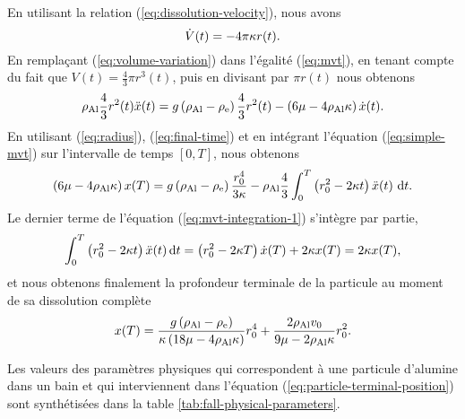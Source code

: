 En utilisant la relation (\ref{eq:dissolution-velocity}), nous avons
\begin{equation}\label{eq:volume-variation}
  \dot V(t) = -4\pi \kappa r(t).
\end{equation}
En remplaçant (\ref{eq:volume-variation}) dans l'égalité
(\ref{eq:mvt}), en tenant compte du fait que $V(t) = \frac{4}{3}\pi
r^3(t)$, puis en divisant par $\pi r(t)$ nous obtenons
\begin{equation}\label{eq:simple-mvt}
\rho_\mathrm{Al} \frac{4}{3}r^2(t)\ddot x(t)
= g\left( \rho_\mathrm{Al} - \rho_\mathrm{e} \right)\frac{4}{3}r^2(t) -
\left( 6\mu - 4\rho_\mathrm{Al}
  \kappa \right)\dot x(t).
\end{equation}
En utilisant (\ref{eq:radius}), (\ref{eq:final-time}) et en
intégrant l'équation (\ref{eq:simple-mvt}) sur l'intervalle de temps $[0, T]$, nous
obtenons
\begin{equation}\label{eq:mvt-integration-1}
\left( 6\mu - 4\rho_\mathrm{Al}\kappa \right)x(T)
= g\left( \rho_\mathrm{Al} -
  \rho_\mathrm{e} \right)\frac{r_0^4}{3\kappa}-\rho_\mathrm{Al}\frac{4}{3}\int_0^T\left( r_0^2
- 2\kappa t \right)\ddot x(t)\,\,\mathrm dt.
\end{equation}
Le dernier terme de l'équation (\ref{eq:mvt-integration-1}) s'intègre
par partie,
\begin{equation}
\int_0^T\left( r_0^2 - 2\kappa t \right)\ddot x(t)\,\mathrm dt =
\left( r_0^2 - 2\kappa T \right)\dot x(T) + 2\kappa x(T) =
2\kappa x(T),
\end{equation}
et nous obtenons finalement la profondeur terminale de la particule au
moment de sa dissolution complète
\begin{equation}\label{eq:particle-terminal-position}
x(T) = \frac{g\left( \rho_\mathrm{Al} - \rho_\mathrm{e}
     \right)}{\kappa
  \left( 18\mu - 4\rho_\mathrm{Al}
    \kappa \right)}r_0^4 + \frac{2 \rho_\mathrm{Al}
  v_0}{9\mu - 2\rho_\mathrm{Al} \kappa} r_0^2.
\end{equation}

Les valeurs des paramètres physiques qui correspondent à une particule
d'alumine dans un bain et qui interviennent dans l'équation
(\ref{eq:particle-terminal-position}) sont synthétisées dans la
table \ref{tab:fall-physical-parameters}.

